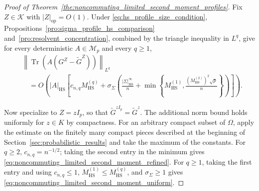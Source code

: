 \documentclass[EJP, preprint, NODS, nobera, nofontexpansion]{ejpecp}
\DeclareMathOperator{\op}{op}
\DeclareMathOperator{\tr}{Tr}
\DeclareMathOperator{\hs}{HS}
\begin{document}
\begin{proof}[Proof of
Theorem~\ref{the:noncommuting_limited_second_moment_profiles}]
Fix $Z\in\mathcal K$ with $|Z|_{\op}=O(1)$.
Under \eqref{eq:hs_profile_size_condition},
Propositions~\ref{pro:sigma_profile_hs_comparison}
and~\ref{pro:resolvent_concentration}, combined by the triangle inequality
in $L^q$, give for every deterministic $A\in\mathcal M_p$ and every $q\geq1$,
\begin{align}
\label{eq:matrix_hs_total_comparison}
&\left\|\tr\!\left(A(G^Z-\widetilde G^Z)\right)\right\|_{L^q}
\nonumber\\
&\quad=O\!\left(|A|_{\hs}\left[
 c_{n,q}M_{\hs}^{(q)}
 +\sigma_\Sigma\left(
  \frac{|\Sigma|_{\hs}^\infty}{n}
  +\min\!\left\{M_{\hs}^{(1)},
       \frac{(M_{\hs}^{(2)})^2\sqrt p}{n}\right\}
 \right)\right]\right).
\end{align}

Now specialize to $Z=zI_p$, so that $\widetilde G^{zI_p}=\tilde G^z$.
The additional norm bound holds uniformly for $z\in K$ by compactness.
For an arbitrary compact subset of $\Omega$, apply the estimate on the
finitely many compact pieces described at the beginning of
Section~\ref{sec:probabilistic_results} and take the maximum of the
constants.
For \(q\geq2\), \(c_{n,q}=n^{-1/2}\); taking the second entry
in the minimum gives
\eqref{eq:noncommuting_limited_second_moment_refined}.
For \(q\geq1\), taking the first entry and using
\(c_{n,q}\leq1\), \(M_{\hs}^{(1)}\leq M_{\hs}^{(q)}\), and
\(\sigma_\Sigma\geq1\) gives
\eqref{eq:noncommuting_limited_second_moment_uniform}.
\end{proof}
\end{document}
